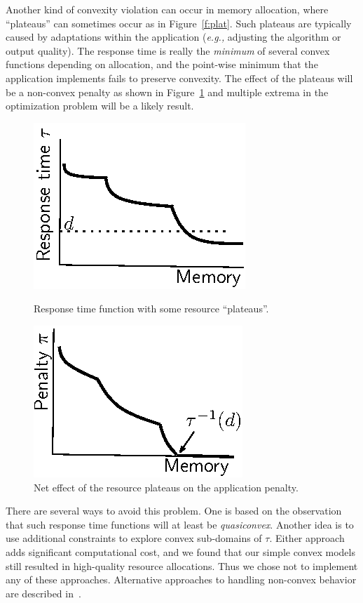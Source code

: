 Another kind of convexity violation can occur in memory allocation, where ``plateaus'' can sometimes occur as in Figure~\ref{f:plat}. Such plateaus are typically caused by adaptations within the application (\emph{e.g.,} adjusting the algorithm or output quality).
The response time is really the \emph{minimum} of several convex functions depending on allocation, and the point-wise minimum that the application implements fails to preserve convexity.  The effect of the plateaus will be a non-convex penalty as shown in Figure~\ref{f:plateffect} and multiple extrema in the optimization problem will be a likely result. 



\begin{figure}[hb]
\parbox{1.6in}{
\includegraphics*{Plateau1.eps}
\caption{\label{f:plat}Response time function with some resource ``plateaus''.}
}
\hspace{\fill}
\parbox{1.6in}{
\includegraphics*{Plateau2.eps}
\caption{\label{f:plateffect}Net effect of the resource plateaus on the application penalty.}
}
\end{figure}
There are several ways to avoid this problem.  One is based on the observation that such response time functions will at least be \emph{quasiconvex}.  Another idea is to use additional constraints to explore convex sub-domains of $\tau$. Either approach adds significant computational cost, and we found that our simple convex models still resulted in high-quality resource allocations. Thus we chose not to implement any of these approaches.  Alternative approaches to handling non-convex behavior are described in~\cite{pacora_tr}. 

